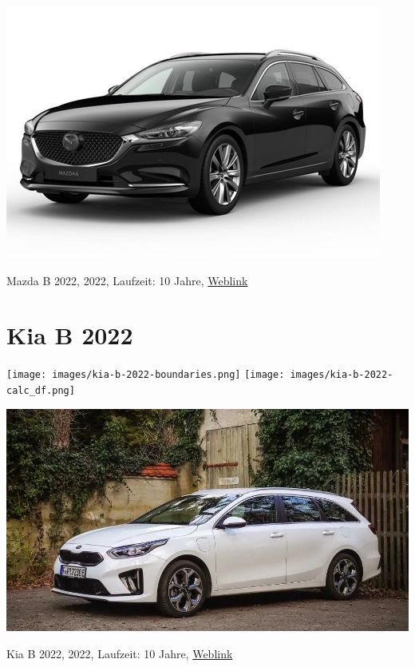 \documentclass[landscape, DIV=99, 14pt]{scrartcl}
\begin{document}
\pagebreak
\null
\vspace{2cm}
\begin{center}
\includegraphics[width=0.9\columnwidth]{cars/mazda-6-neu.png}

Mazda B 2022, 2022, Laufzeit: 10 Jahre, \href{https://konfigurator.meinauto.de/mazda/neuwagen/48-6/angebote/6-kombi/konfigurator/\#!/extras/exclusive-line/8846370/10,11/private/65352-5416-204698/984/61c9aa657e74c/cash-purchase/32545--287374/48,0,10000,0,0,0,0,0,}{Weblink}
\end{center}

\pagebreak


\twocolumn

\section*{Kia B 2022}
\begin{center}
\texttt{[image: images/kia-b-2022-boundaries.png]}
\null
\vspace{0.5cm}
\texttt{[image: images/kia-b-2022-calc\_df.png]}
\end{center}

\pagebreak
\null
\vspace{2cm}
\begin{center}
\includegraphics[width=0.9\columnwidth]{cars/kia-ceed-sportswagon.png}

Kia B 2022, 2022, Laufzeit: 10 Jahre, \href{https://konfigurator.meinauto.de/kia/neuwagen/cee-d/angebote/cee-d-sporty-wagon/konfigurator/\#!/preisvergleich/platinum/8867329/3,7,18/private/109347-4167-291321/1321/61d21ce73c5db/cash-purchase/109348-8088-291322/48,0,10000,0,0,0,0,0,}{Weblink}
\end{center}
\end{document}
